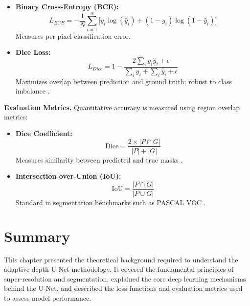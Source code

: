 \begin{itemize}
    \item \textbf{Binary Cross-Entropy (BCE):}
    \[
    L_{BCE} = -\frac{1}{N}\sum_{i=1}^{N} \big[y_i \log(\hat{y}_i) + (1 - y_i)\log(1 - \hat{y}_i)\big]
    \]
    Measures per-pixel classification error.

    \item \textbf{Dice Loss:}
    \[
    L_{Dice} = 1 - \frac{2 \sum_i y_i \hat{y}_i + \epsilon}{\sum_i y_i + \sum_i \hat{y}_i + \epsilon}
    \]
    Maximizes overlap between prediction and ground truth; robust to class imbalance \cite{dice1945measures}.
\end{itemize}

\textbf{Evaluation Metrics.}
Quantitative accuracy is measured using region overlap metrics:

\begin{itemize}
    \item \textbf{Dice Coefficient:}
    \[
    \text{Dice} = \frac{2 \times |P \cap G|}{|P| + |G|}
    \]
    Measures similarity between predicted and true masks \cite{dice1945measures}.

    \item \textbf{Intersection-over-Union (IoU):}
    \[
    \text{IoU} = \frac{|P \cap G|}{|P \cup G|}
    \]
    Standard in segmentation benchmarks such as PASCAL VOC \cite{everingham2010pascal}.
\end{itemize}


\section{Summary}
\label{sec:prelim_summary}

This chapter presented the theoretical background required to understand 
the adaptive-depth U-Net methodology. 
It covered the fundamental principles of super-resolution and segmentation, 
explained the core deep learning mechanisms behind the U-Net, 
and described the loss functions and evaluation metrics used to assess model performance.